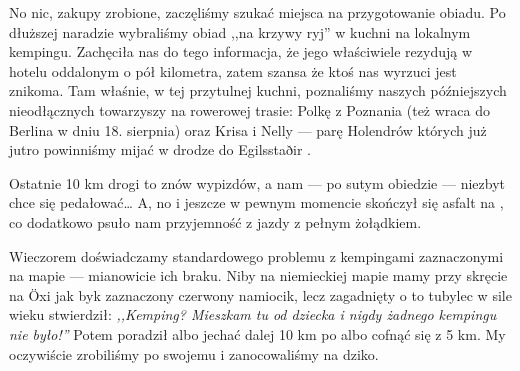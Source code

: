 No nic, zakupy zrobione, zaczęliśmy szukać miejsca na przygotowanie obiadu. Po dłuższej naradzie wybraliśmy obiad ,,na krzywy ryj'' w kuchni na lokalnym kempingu. Zachęciła nas do tego informacja, że jego właściwiele rezydują w hotelu oddalonym o pół kilometra, zatem szansa że ktoś nas wyrzuci jest znikoma. Tam właśnie, w tej przytulnej kuchni, poznaliśmy naszych późniejszych nieodłącznych towarzyszy na rowerowej trasie: Polkę z Poznania (też wraca do Berlina w dniu 18. sierpnia) oraz Krisa i Nelly --- parę Holendrów których już jutro powinniśmy mijać w drodze do Egilsstaðir .

Ostatnie 10 km drogi to znów wypizdów, a nam --- po sutym obiedzie --- niezbyt chce się pedałować… A, no i jeszcze w pewnym momencie skończył się asfalt na , co dodatkowo psuło nam przyjemność z jazdy z pełnym żołądkiem.


Wieczorem doświadczamy standardowego problemu z kempingami zaznaczonymi na mapie --- mianowicie ich braku. Niby na niemieckiej mapie mamy przy skręcie na Öxi jak byk zaznaczony czerwony namiocik, lecz zagadnięty o to tubylec w sile wieku stwierdził: \emph{,,Kemping? Mieszkam tu od dziecka i nigdy żadnego kempingu nie było!''} Potem poradził albo jechać dalej 10 km po  albo cofnąć się z 5 km. My oczywiście zrobiliśmy po swojemu i zanocowaliśmy na dziko.